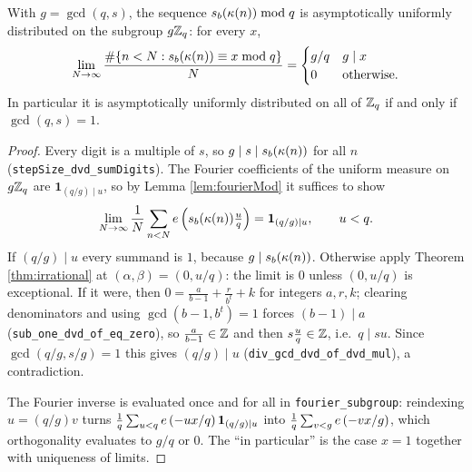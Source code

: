 \begin{proposition}[Proposition 5.1]
  \label{prop:sumDigits}
  \leanok
  With $g = \gcd(q, s)$, the sequence $s_b(\kappa(n)) \bmod q$ is
  asymptotically uniformly distributed on the subgroup $g\mathbb{Z}_q$: for every $x$,
  \[
    \lim_{N \to \infty} \frac{\#\{n<N : s_b(\kappa(n)) \equiv x \bmod q\}}{N}
      = \begin{cases} g/q & g \mid x \\ 0 & \text{otherwise.}\end{cases}
  \]
  In particular it is asymptotically uniformly distributed on all of $\mathbb{Z}_q$ if
  and only if $\gcd(q,s) = 1$.
\end{proposition}
\begin{proof}
  \leanok
  Every digit is a multiple of $s$, so $g \mid s \mid s_b(\kappa(n))$ for all
  $n$ (\texttt{stepSize\_dvd\_sumDigits}). The Fourier coefficients of the
  uniform measure on $g\mathbb{Z}_q$ are $\mathbf 1_{(q/g) \mid u}$, so by Lemma
  \ref{lem:fourierMod} it suffices to show
  \[
    \lim_{N\to\infty} \frac1N \sum_{n<N} e\left(s_b(\kappa(n))\tfrac uq\right)
      = \mathbf 1_{(q/g)\mid u}, \qquad u < q .
  \]
  If $(q/g) \mid u$ every summand is $1$, because $g \mid s_b(\kappa(n))$.
  Otherwise apply Theorem \ref{thm:irrational} at $(\alpha,\beta) = (0,u/q)$:
  the limit is $0$ unless $(0,u/q)$ is exceptional. If it were, then
  $0 = \frac{a}{b-1} + \frac{r}{b^t} + k$ for integers $a,r,k$; clearing
  denominators and using $\gcd(b-1,b^t) = 1$ forces $(b-1) \mid a$
  (\texttt{sub\_one\_dvd\_of\_eq\_zero}), so $\frac{a}{b-1} \in \mathbb{Z}$ and then
  $s\frac uq \in \mathbb{Z}$, i.e.\ $q \mid su$. Since
  $\gcd(q/g, s/g) = 1$ this gives $(q/g) \mid u$
  (\texttt{div\_gcd\_dvd\_of\_dvd\_mul}), a contradiction.

  The Fourier inverse is evaluated once and for all in
  \texttt{fourier\_subgroup}: reindexing $u = (q/g)v$ turns
  $\frac1q\sum_{u<q}e\left(-ux/q\right)\mathbf 1_{(q/g)\mid u}$ into
  $\frac1q\sum_{v<g}e\left(-vx/g\right)$, which orthogonality evaluates to $g/q$ or $0$.
  The ``in particular'' is the case $x = 1$ together with uniqueness of
  limits.
\end{proof}

